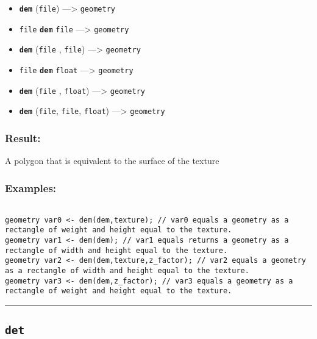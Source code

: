 \documentclass[]{book}
\providecommand{\tightlist}{%
  \setlength{\itemsep}{0pt}\setlength{\parskip}{0pt}}
\theoremstyle{definition}
\theoremstyle{definition}
\theoremstyle{definition}
\theoremstyle{remark}
\begin{document}
\begin{itemize}
\tightlist
\item
  \textbf{\texttt{dem}} (\texttt{file}) ---\textgreater{}
  \texttt{geometry}
\item
  \texttt{file} \textbf{\texttt{dem}} \texttt{file} ---\textgreater{}
  \texttt{geometry}
\item
  \textbf{\texttt{dem}} (\texttt{file} , \texttt{file})
  ---\textgreater{} \texttt{geometry}
\item
  \texttt{file} \textbf{\texttt{dem}} \texttt{float} ---\textgreater{}
  \texttt{geometry}
\item
  \textbf{\texttt{dem}} (\texttt{file} , \texttt{float})
  ---\textgreater{} \texttt{geometry}
\item
  \textbf{\texttt{dem}} (\texttt{file}, \texttt{file}, \texttt{float})
  ---\textgreater{} \texttt{geometry}
\end{itemize}

\subsubsection{Result:}\label{result-124}

A polygon that is equivalent to the surface of the texture

\subsubsection{Examples:}\label{examples-98}

\begin{verbatim}
 
geometry var0 <- dem(dem,texture); // var0 equals a geometry as a rectangle of weight and height equal to the texture. 
geometry var1 <- dem(dem); // var1 equals returns a geometry as a rectangle of width and height equal to the texture. 
geometry var2 <- dem(dem,texture,z_factor); // var2 equals a geometry as a rectangle of width and height equal to the texture. 
geometry var3 <- dem(dem,z_factor); // var3 equals a geometry as a rectangle of weight and height equal to the texture.
\end{verbatim}

\begin{center}\rule{0.5\linewidth}{\linethickness}\end{center}

\subsection{\texorpdfstring{\texttt{det}}{det}}\label{det}
\end{document}
